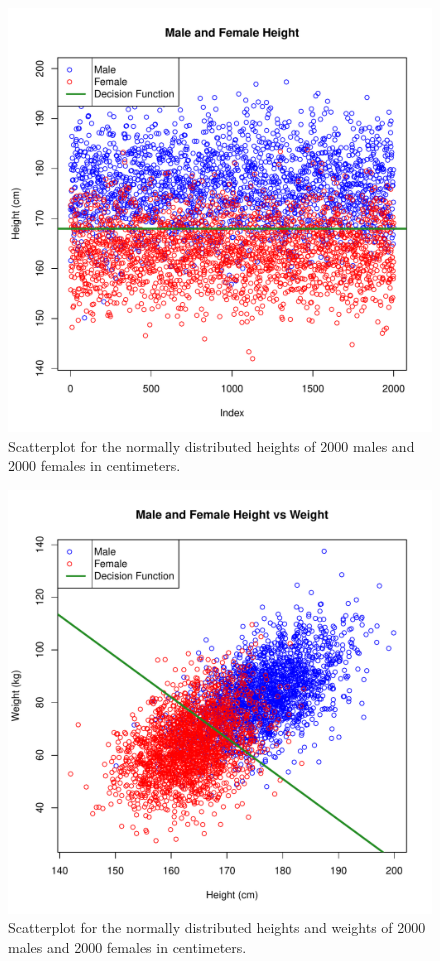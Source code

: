 \documentclass[10pt,letterpaper]{hitec}
\begin{document}
\begin{figure}[p]
\centerline{\includegraphics[height=0.9\textheight]{heights.pdf}}
\caption{Scatterplot for the normally distributed heights of 2000 males and 2000 females in centimeters.}
\end{figure}


\begin{figure}[p]
\centerline{\includegraphics[height=0.9\textheight]{heightsweights.pdf}}
\caption{Scatterplot for the normally distributed heights and weights of 2000 males and 2000 females in centimeters.}
\end{figure}
\end{document}
